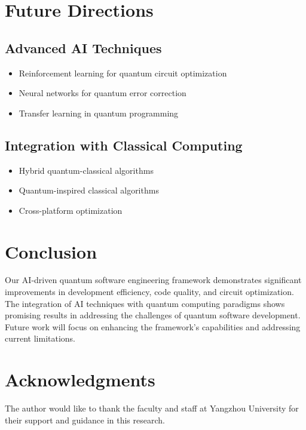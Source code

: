 \documentclass[10pt,twocolumn]{article}
\begin{document}
\section{Future Directions}
\subsection{Advanced AI Techniques}
\begin{itemize}[leftmargin=*]
    \item Reinforcement learning for quantum circuit optimization
    \item Neural networks for quantum error correction
    \item Transfer learning in quantum programming
\end{itemize}

\subsection{Integration with Classical Computing}
\begin{itemize}[leftmargin=*]
    \item Hybrid quantum-classical algorithms
    \item Quantum-inspired classical algorithms
    \item Cross-platform optimization
\end{itemize}

\section{Conclusion}
Our AI-driven quantum software engineering framework demonstrates significant improvements in development efficiency, code quality, and circuit optimization. The integration of AI techniques with quantum computing paradigms shows promising results in addressing the challenges of quantum software development. Future work will focus on enhancing the framework's capabilities and addressing current limitations.

\section*{Acknowledgments}
The author would like to thank the faculty and staff at Yangzhou University for their support and guidance in this research.




\balance
\end{document}
